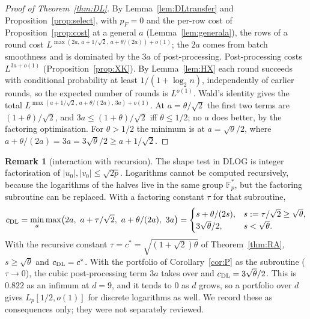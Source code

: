 \documentclass[11pt]{amsart}
\theoremstyle{definition}
\newtheorem{remark}[theorem]{Remark}
\newcommand{\F}{\mathbb{F}}
\begin{document}
\begin{proof}[Proof of Theorem~\ref{thm:DL}]
By Lemma~\ref{lem:DLtransfer} and Proposition~\ref{prop:select}, with $p_F=0$ and the per-row cost of Proposition~\ref{prop:cost} at a general $a$
(Lemma~\ref{lem:generala}), the rows of a round cost $L^{\max(2a,\,a+1/\sqrt2,\,a+\theta/(2a))+o(1)}$; the $2a$ comes from batch smoothness
and is dominated by the $3a$ of post-processing. Post-processing costs $L^{3a+o(1)}$ (Proposition~\ref{prop:XK}).
By Lemma~\ref{lem:HX} each round succeeds with conditional probability at least $1/(1+\log_2n)$, independently of earlier rounds, so the expected number of
rounds is $L^{o(1)}$. Wald's identity gives the total $L^{\max(a+1/\sqrt2,\,a+\theta/(2a),\,3a)+o(1)}$. At $a=\theta/\sqrt2$ the first two terms are
$(1+\theta)/\sqrt2$, and $3a\le(1+\theta)/\sqrt2$ iff $\theta\le1/2$; no $a$ does better, by the factoring optimisation. For $\theta>1/2$ the minimum is at
$a=\sqrt\theta/2$, where $a+\theta/(2a)=3a=3\sqrt\theta/2\ge a+1/\sqrt2$.
\end{proof}

\begin{remark}[interaction with recursion]\label{rem:DLrec}
The shape test in DLOG is integer factorisation of $|u_0|,|v_0|\le\sqrt{2p}$. Logarithms cannot be computed recursively, because the logarithms
of the halves live in the same group $\F_p^*$, but the factoring subroutine can be replaced. With a factoring constant $\tau$ for that subroutine,
\[
c_{\rm DL}=\min_a\max\bigl(2a,\ a+\tau/\sqrt2,\ a+\theta/(2a),\ 3a\bigr)=\begin{cases}s+\theta/(2s),& s:=\tau/\sqrt2\ge\sqrt\theta,\\ 3\sqrt\theta/2,& s<\sqrt\theta.\end{cases}
\]
With the recursive constant $\tau=c^*=\sqrt{(1+\sqrt2)\theta}$ of Theorem~\ref{thm:RA}, $s\ge\sqrt\theta$ and $c_{\rm DL}=c^*$. With the portfolio of
Corollary~\ref{cor:P} as the subroutine ($\tau\to0$), the cubic post-processing term $3a$ takes over and $c_{\rm DL}=3\sqrt\theta/2$. This is $0.822$ as an
infimum at $d=9$, and it tends to $0$ as $d$ grows, so a portfolio over $d$ gives $L_p[1/2,o(1)]$ for discrete logarithms as well. We record these as
consequences only; they were not separately reviewed.
\end{remark}
\end{document}
